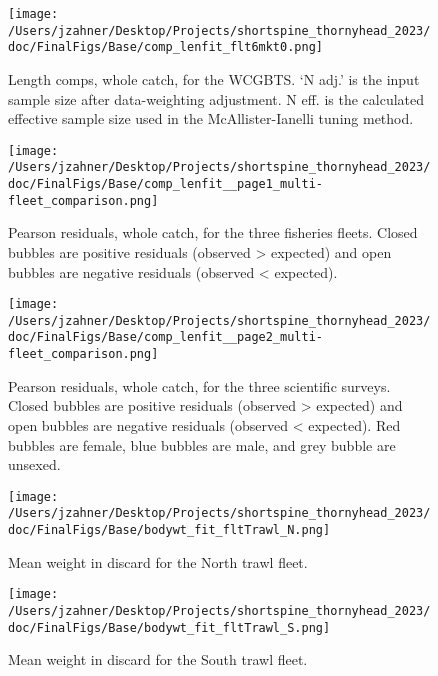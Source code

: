 \documentclass[11pt,
  english,
  letterpaper,
]{article}
\begin{document}
\begin{figure}
\centering
\texttt{[image: /Users/jzahner/Desktop/Projects/shortspine\_thornyhead\_2023/doc/FinalFigs/Base/comp\_lenfit\_flt6mkt0.png]}
\caption{Length comps, whole catch, for the WCGBTS. `N adj.' is the input sample size after data-weighting adjustment. N eff. is the calculated effective sample size used in the McAllister-Ianelli tuning method.\label{fig:fits_wcgbts}}
\end{figure}

\begin{figure}
\centering
\texttt{[image: /Users/jzahner/Desktop/Projects/shortspine\_thornyhead\_2023/doc/FinalFigs/Base/comp\_lenfit\_\_page1\_multi-fleet\_comparison.png]}
\caption{Pearson residuals, whole catch, for the three fisheries fleets. Closed bubbles are positive residuals (observed \textgreater{} expected) and open bubbles are negative residuals (observed \textless{} expected).\label{fig:resids_fisheries}}
\end{figure}

\begin{figure}
\centering
\texttt{[image: /Users/jzahner/Desktop/Projects/shortspine\_thornyhead\_2023/doc/FinalFigs/Base/comp\_lenfit\_\_page2\_multi-fleet\_comparison.png]}
\caption{Pearson residuals, whole catch, for the three scientific surveys. Closed bubbles are positive residuals (observed \textgreater{} expected) and open bubbles are negative residuals (observed \textless{} expected). Red bubbles are female, blue bubbles are male, and grey bubble are unsexed.\label{fig:resids_survey}}
\end{figure}

\begin{figure}
\centering
\texttt{[image: /Users/jzahner/Desktop/Projects/shortspine\_thornyhead\_2023/doc/FinalFigs/Base/bodywt\_fit\_fltTrawl\_N.png]}
\caption{Mean weight in discard for the North trawl fleet.\label{fig:weightNorthTrl}}
\end{figure}

\begin{figure}
\centering
\texttt{[image: /Users/jzahner/Desktop/Projects/shortspine\_thornyhead\_2023/doc/FinalFigs/Base/bodywt\_fit\_fltTrawl\_S.png]}
\caption{Mean weight in discard for the South trawl fleet.\label{fig:weightSouthTrl}}
\end{figure}
\end{document}
